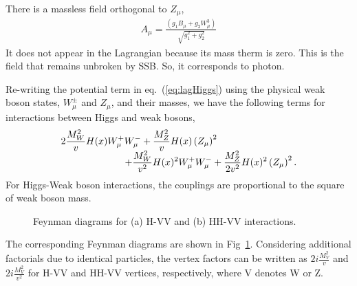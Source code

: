 There is a massless field orthogonal to $Z_\mu$,  
\begin{eqnarray} 
A_\mu = \frac{\left( g_1 B_\mu + g_2 W_\mu^3 \right)}{\sqrt{g_1^2+g_2^2}}  
\end{eqnarray}
It does not appear in the Lagrangian because its mass therm is zero.
This is the field that remains unbroken by SSB. So, it corresponds to photon. 

Re-writing the potential term in eq.~(\ref{eq:lagHiggs})
using the physical weak boson states, $W_\mu^\pm$ and $Z_\mu$,
and their masses, we have the following terms for interactions between Higgs and weak bosons,
\begin{eqnarray}
\begin{array}{ccc} \multicolumn{2}{c}{\displaystyle 
2\frac{M_W^2}{v} H(x) W^+_\mu W^-_\mu
+ \frac{M_Z^2}{v} H(x) \left( Z_\mu \right)^2
} & \\ & \multicolumn{2}{c}{\hspace{2cm} \displaystyle
+ \frac{M_W^2}{v^2} H(x)^2 W^+_\mu W^-_\mu 
+\frac{M_Z^2}{2v^2} H(x)^2 \left( Z_\mu \right)^2.
} \end{array}   
\end{eqnarray} 
For Higgs-Weak boson interactions, the couplings are proportional to the square 
of weak boson mass.
\begin{figure}[htp]
\centering
\vspace{1cm}
\hspace{1cm}
\caption{ Feynman diagrams for (a) H-VV and (b) HH-VV interactions.
}
\vspace{0.5cm}
\label{fig:fd_HVterm}
\end{figure}
The corresponding Feynman diagrams are shown in Fig~\ref{fig:fd_HVterm}. 
Considering additional factorials due to identical particles, the 
vertex factors can be written as $\displaystyle 2i \frac {M_V^2}{v}$ 
and $\displaystyle 2i \frac{M_V^2}{v^2}$ for H-VV and HH-VV vertices, respectively, 
where V denotes W or Z. 

